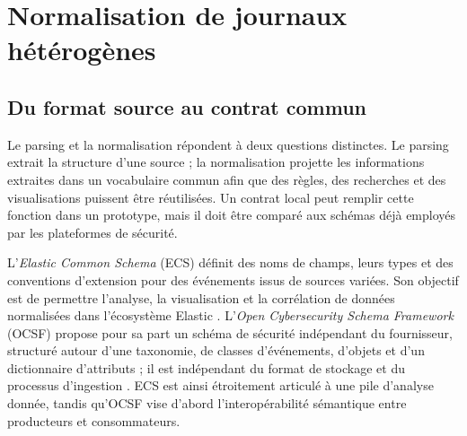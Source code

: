 
\section{Normalisation de journaux hétérogènes}

\subsection{Du format source au contrat commun}

Le parsing et la normalisation répondent à deux questions distinctes. Le parsing extrait
la structure d'une source ; la normalisation projette les informations extraites dans un
vocabulaire commun afin que des règles, des recherches et des visualisations puissent
être réutilisées. Un contrat local peut remplir cette fonction dans un prototype, mais il
doit être comparé aux schémas déjà employés par les plateformes de sécurité.

L'\textit{Elastic Common Schema} (ECS) définit des noms de champs, leurs types et des
conventions d'extension pour des événements issus de sources variées. Son objectif est de
permettre l'analyse, la visualisation et la corrélation de données normalisées dans
l'écosystème Elastic \cite{elastic2026ecs}. L'\textit{Open Cybersecurity Schema
Framework} (OCSF) propose pour sa part un schéma de sécurité indépendant du fournisseur,
structuré autour d'une taxonomie, de classes d'événements, d'objets et d'un dictionnaire
d'attributs ; il est indépendant du format de stockage et du processus d'ingestion
\cite{ocsf2026schema}. ECS est ainsi étroitement articulé à une pile d'analyse donnée,
tandis qu'OCSF vise d'abord l'interopérabilité sémantique entre producteurs et
consommateurs.

